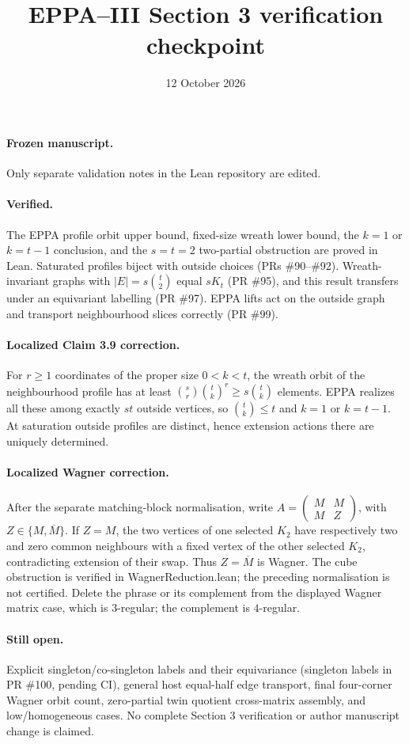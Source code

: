 \documentclass[11pt]{article}
\title{EPPA--III Section 3 verification checkpoint}
\date{12 October 2026}
\begin{document}
\maketitle
\paragraph{Frozen manuscript.} Only separate validation notes in the Lean repository are edited.
\paragraph{Verified.} The EPPA profile orbit upper bound, fixed-size wreath lower bound,
the $k=1$ or $k=t-1$ conclusion, and the $s=t=2$ two-partial obstruction
are proved in Lean. Saturated profiles biject with outside choices (PRs \#90--\#92).
Wreath-invariant graphs with $|E|=s\binom t2$ equal $sK_t$ (PR \#95),
and this result transfers under an equivariant labelling (PR \#97).
EPPA lifts act on the outside graph and transport neighbourhood slices correctly (PR \#99).
\paragraph{Localized Claim 3.9 correction.} For $r\ge1$ coordinates of
the proper size $0<k<t$, the wreath orbit of the neighbourhood profile
has at least $\binom sr\binom tk^r\ge s\binom tk$ elements.
EPPA realizes all these among exactly $st$ outside vertices, so
$\binom tk\le t$ and $k=1$ or $k=t-1$. At saturation outside profiles
are distinct, hence extension actions there are uniquely determined.
\paragraph{Localized Wagner correction.} After the separate matching-block
normalisation, write $A=\left(\begin{smallmatrix}M&M\\M&Z\end{smallmatrix}\right)$,
with $Z\in\{M,\overline M\}$. If $Z=M$, the two vertices of one selected
$K_2$ have respectively two and zero common neighbours with a fixed
vertex of the other selected $K_2$, contradicting extension of their swap.
Thus $Z=\overline M$ is Wagner. The cube obstruction is verified in
WagnerReduction.lean; the preceding normalisation is not certified.
Delete the phrase or its complement from the displayed Wagner matrix case,
which is $3$-regular; the complement is $4$-regular.
\paragraph{Still open.} Explicit singleton/co-singleton labels and their
equivariance (singleton labels in PR \#100, pending CI), general host
equal-half edge transport, final four-corner Wagner orbit count,
zero-partial twin quotient cross-matrix assembly, and low/homogeneous cases.
No complete Section 3 verification or author manuscript change is claimed.
\end{document}
